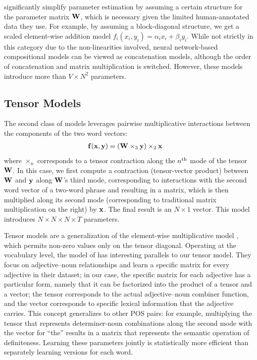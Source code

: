\documentclass[11pt]{article}
\newcommand{\bX}{{\bf x}}
\newcommand{\bY}{{\bf y}}
\newcommand{\bF}{{\bf f}}
\newcommand{\bW}{{\bf W}}
\begin{document}
 significantly simplify parameter estimation by assuming a certain structure for the parameter matrix $\bW$, which is necessary given the limited human-annotated data they use.   
For example, by assuming a block-diagonal structure, we get a scaled element-wise addition model $f_i (x_i, y_i) = \alpha_i x_i + \beta_i y_i$. 
While not strictly in this category due to the non-linearities involved, neural network-based compositional models \cite{Socher2013,Hermann2013} can be viewed as concatenation models, although the order of concatenation and matrix multiplication is switched. 
However, these models introduce more than $V \times N^2$ parameters. 

\subsection{Tensor Models}
\label{sec:tensor}

The second class of models leverages pairwise multiplicative interactions between the components of the two word vectors:
\begin{align}
	\bF (\bX, \bY) &= (\bW \times_3 \bY) \times_2 \bX
	\label{eq:tensor}
\end{align}
where $\times_n$ corresponds to a tensor contraction along the $n\textsuperscript{th}$ mode of the tensor $\bW$. 
In this case, we first compute a contraction (tensor-vector product) between $\bW$ and $\bY$ along $\bW$'s third mode, corresponding to interactions with the second word vector of a two-word phrase and resulting in a matrix, which is then multiplied along its second mode (corresponding to traditional matrix multiplication on the right) by $\bX$.  
The final result is an $N \times 1$ vector.  
This model introduces $N \times N \times N \times T$ parameters.  

Tensor models are a generalization of the element-wise multiplicative model \cite{Mitchell2008}, which permits non-zero values only on the tensor diagonal.  
Operating at the vocabulary level, the model of  has interesting parallels to our tensor model. 
They focus on adjective--noun relationships and learn a specific matrix for every adjective in their dataset; in our case, the specific matrix for each adjective has a particular form, namely that it can be factorized into the product of a tensor and a vector; the tensor corresponds to the actual adjective--noun combiner function, and the vector corresponds to specific lexical information that the adjective carries. 
This concept generalizes to other POS pairs: for example, multiplying the tensor that represents determiner-noun combinations along the second mode with the vector for ``the'' results in a matrix that represents the semantic operation of definiteness. 
Learning these parameters jointly is statistically more efficient than separately learning versions for each word.
\end{document}
